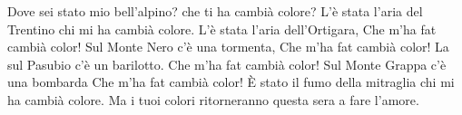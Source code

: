\chordsoff
\beginverse
Dove sei stato mio bell'alpino?
che ti ha cambià colore?
\endverse
\beginverse
L'è stata l'aria del Trentino
chi mi ha cambià colore.
\endverse
\beginverse
L'è stata l'aria dell'Ortigara,
Che m'ha fat cambià color!
\endverse
\beginverse
Sul Monte Nero c'è una tormenta,
Che m'ha fat cambià color!
\endverse
\beginverse
La sul Pasubio c'è un barilotto.
Che m'ha fat cambià color!
\endverse
\beginverse
Sul Monte Grappa c'è una bombarda
Che m'ha fat cambià color!
\endverse
\beginverse
È stato il fumo della mitraglia
chi mi ha cambià colore.
\endverse
\beginverse
Ma i tuoi colori ritorneranno
questa sera a fare l'amore.
\endverse
\endsong